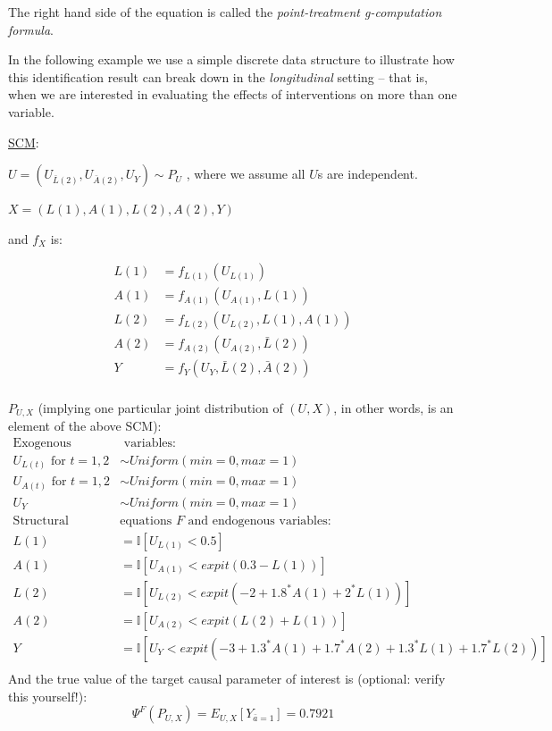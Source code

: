 \documentclass[answers]{exam}
\begin{document}
\vspace{-4mm}
\noindent The right hand side of the equation is called the \textit{point-treatment g-computation formula}. 
\vspace{3mm}

In the following example we use a simple discrete data structure to illustrate how this identification result can break down in the \textit{longitudinal} setting -- that is, when we are interested in evaluating the effects of interventions on more than one variable. 


\noindent\underline{SCM}:

$U=(U_{\bar{L}(2)}, U_{\bar{A}(2)}, U_Y) \sim P_U$ , where we assume all $U$s are independent. 

$X=(L(1), A(1), L(2), A(2), Y)$ 

and $f_X$ is:

\begin{align*}
L(1)&=f_{L(1)}(U_{L(1)}) \\
A(1)&=f_{A(1)}(U_{A(1)}, L(1)) \\
L(2)&=f_{L(2)}(U_{L(2)}, L(1), A(1)) \\
A(2)&=f_{A(2)}(U_{A(2)}, \bar{L}(2)) \\
Y&=f_{Y}(U_{Y}, \bar{L}(2), \bar{A}(2))\\
\end{align*}

\noindent \underline{$P_{U,X}$} (implying one particular joint distribution of $(U, X)$, in other words, is an element of the above SCM):
\begin{align*}
\text{Exogenous} & \text{ variables:} \\
U_{L(t)} \text{ for } t = 1,2 & \sim Uniform(min=0, max=1) \\
U_{A(t)} \text{ for } t = 1,2 &\sim Uniform(min=0, max=1) \\
U_{Y} &\sim Uniform(min=0, max=1) \\
\text{Structural } & \text{equations $F$ and endogenous variables:}  \\
L(1)& = \mathbb{I}[U_{L(1)}<0.5] \\
A(1)& = \mathbb{I}[U_{A(1)}<expit(0.3-L(1))]\\
L(2)& = \mathbb{I}[U_{L(2)}<expit(-2+1.8^*A(1)+2^*L(1))] \\
A(2)& = \mathbb{I}[U_{A(2)}<expit(L(2)+L(1))] \\
Y& = \mathbb{I}[U_{Y}<expit(-3+1.3^*A(1)+1.7^*A(2)+1.3^*L(1)+1.7^*L(2))]\\
\end{align*}
And the true value of the target causal parameter of interest is (optional: verify this yourself!):
\[
\Psi^F(P_{U,X}) = E_{U,X}[Y_{\bar{a}=1}] = 0.7921
\]
\end{document}
